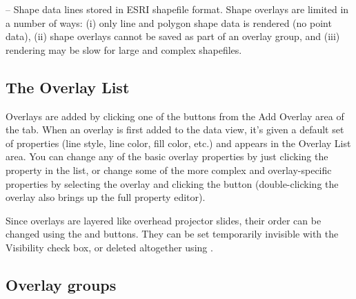 \begin{description}
\begin{itemize}
\end{itemize}

\item[\button{shapes}{Shape}] -- Shape data lines stored in ESRI
shapefile format. Shape overlays are limited in a number of ways:
(i) only line and polygon shape data is rendered (no point data),
(ii) shape overlays cannot be saved as part of an overlay group,
and (iii) rendering may be slow for large and complex shapefiles.

\end{description}

\subsection{The {\gui Overlay List}}
\label{overlay_list}

Overlays are added by clicking one of the buttons from the
{\gui Add Overlay} area of the 
tab.  When an overlay is first added to the data view, it's given
a default set of properties (line style, line color, fill color,
etc.) and appears in the {\gui Overlay List} area.  You can change
any of the basic overlay properties by just clicking the property
in the list, or change some of the more complex and
overlay-specific properties by selecting the overlay and clicking
the  button
(double-clicking the overlay also brings up the full property
editor).

Since overlays are layered like overhead projector slides, their
order can be changed using the 
and  buttons.  They can be
set temporarily invisible with the {\gui Visibility} check box, or
deleted altogether using .

\subsection{Overlay groups}


